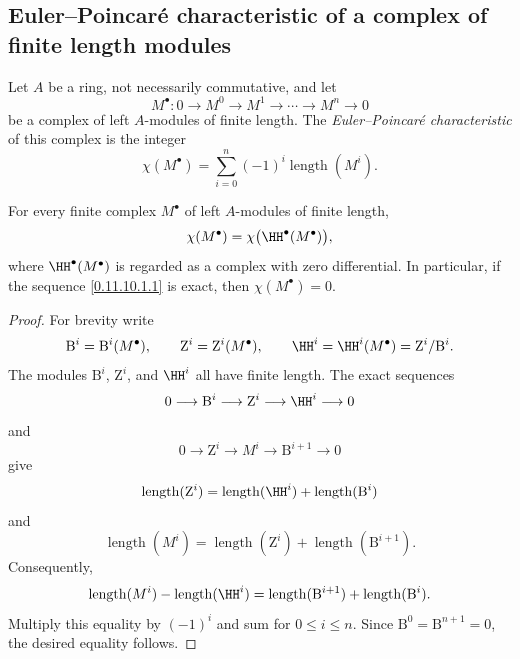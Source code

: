 \subsection{Euler--Poincar\'e characteristic of a complex of finite length modules}
\label{subsection:0.11.10}

\begin{env}[11.10.1]
\label{0.11.10.1}
Let $A$ be a ring, not necessarily commutative, and let
\[
  M^\bullet:
  0\longrightarrow M^0\longrightarrow M^1
  \longrightarrow\cdots\longrightarrow M^n\longrightarrow 0
  \tag{11.10.1.1}\label{0.11.10.1.1}
\]
be a complex of left $A$-modules of finite length.
The \emph{Euler--Poincar\'e characteristic} of this complex is the
integer
\[
  \chi(M^\bullet)
  =
  \sum_{i=0}^{n}(-1)^i\operatorname{length}(M^i).
  \tag{11.10.1.2}\label{0.11.10.1.2}
\]
\end{env}

\begin{proposition}[11.10.2]
\label{0.11.10.2}
For every finite complex $M^\bullet$ of left $A$-modules of finite
length,
\[
  \chi(M^\bullet)=\chi\bigl(\HH^\bullet(M^\bullet)\bigr),
\]
where $\HH^\bullet(M^\bullet)$ is regarded as a complex with zero
differential.
In particular, if the sequence \eqref{0.11.10.1.1} is exact, then
$\chi(M^\bullet)=0$.
\end{proposition}

\begin{proof}
For brevity write
\[
  \mathrm{B}^i=\mathrm{B}^i(M^\bullet),
  \qquad
  \mathrm{Z}^i=\mathrm{Z}^i(M^\bullet),
  \qquad
  \HH^i=\HH^i(M^\bullet)=\mathrm{Z}^i/\mathrm{B}^i.
\]
The modules $\mathrm{B}^i$, $\mathrm{Z}^i$, and $\HH^i$ all have
finite length.
The exact sequences
\[
  0\longrightarrow\mathrm{B}^i
  \longrightarrow\mathrm{Z}^i
  \longrightarrow\HH^i
  \longrightarrow0
\]
and
\[
  0\longrightarrow\mathrm{Z}^i
  \longrightarrow M^i
  \longrightarrow\mathrm{B}^{i+1}
  \longrightarrow0
\]
give
\[
  \operatorname{length}(\mathrm{Z}^i)
  =
  \operatorname{length}(\HH^i)
  +
  \operatorname{length}(\mathrm{B}^i)
\]
and
\[
  \operatorname{length}(M^i)
  =
  \operatorname{length}(\mathrm{Z}^i)
  +
  \operatorname{length}(\mathrm{B}^{i+1}).
\]
Consequently,
\[
  \operatorname{length}(M^i)-\operatorname{length}(\HH^i)
  =
  \operatorname{length}(\mathrm{B}^{i+1})
  +
  \operatorname{length}(\mathrm{B}^i).
\]
Multiply this equality by $(-1)^i$ and sum for $0\leq i\leq n$.
Since $\mathrm{B}^0=\mathrm{B}^{n+1}=0$, the desired equality follows.
\end{proof}

